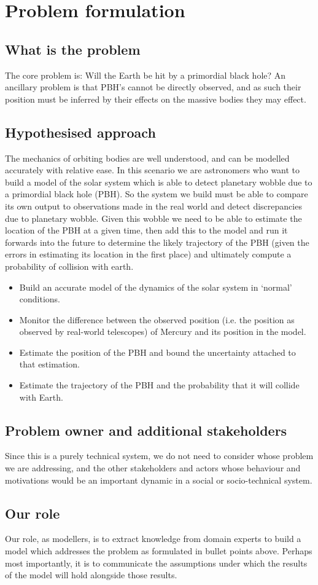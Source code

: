 \section{Problem formulation}

\subsection{What is the problem}
The core problem is: Will the Earth be hit by a primordial black hole? An 
ancillary problem is that PBH's cannot be directly observed, and as such their
position must be inferred by their effects on the massive bodies they may effect.

\subsection{Hypothesised approach}
The mechanics of orbiting bodies are well understood, and can be modelled
accurately with relative ease. In this scenario we are astronomers who want to
build a model of the solar system which is able to detect planetary wobble due
to a primordial black hole (PBH). So the system we build must be able to
compare its own output to observations made in the real world and detect
discrepancies due to planetary wobble. Given this wobble we need to be able to
estimate the location of the PBH at a given time, then add this to the model
and run it forwards into the future to determine the likely trajectory of the
PBH (given the errors in estimating its location in the first place) and
ultimately compute a probability of collision with earth.

\begin{itemize}
\item Build an accurate model of the dynamics of the solar system in `normal'
conditions.
\item Monitor the difference between the observed  position (i.e. the position
as observed by real-world telescopes) of Mercury and its position in the model.
\item Estimate the  position of the PBH and bound the uncertainty attached to
that estimation.
\item Estimate the trajectory of the PBH and the probability that it will
collide with Earth.
\end{itemize}

\subsection{Problem owner and additional stakeholders}
Since this is a purely technical system, we do not need to consider whose
problem we are addressing, and the other stakeholders and actors whose
behaviour and motivations would be an important dynamic in a social or
socio-technical system.

\subsection{Our role}
Our role, as modellers, is to extract knowledge from domain experts to build
a model which addresses the problem as formulated in bullet points above. Perhaps
most importantly, it is to communicate the assumptions under which the results
of the model will hold alongside those results.
